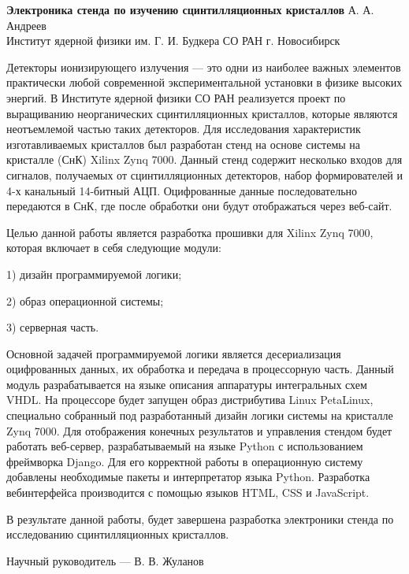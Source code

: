\documentclass[10pt,a5paper]{scrartcl}
\begin{document}
    \begin{center}
        \textbf{Электроника стенда по изучению сцинтилляционных кристаллов}
        \bigbreak
        А. А. Андреев \\
        Институт ядерной физики им. Г. И. Будкера СО РАН г. Новосибирск
    \end{center}

    Детекторы ионизирующего излучения --- это одни из наиболее важных элементов практически любой современной экспериментальной установки в физике высоких энергий. В Институте ядерной физики СО РАН реализуется проект по выращиванию неорганических сцинтилляционных кристаллов, которые являются неотъемлемой частью таких детекторов. Для исследования характеристик изготавливаемых кристаллов был разработан стенд на основе системы на кристалле (СнК) Xilinx Zynq 7000. Данный стенд содержит несколько входов для сигналов, получаемых от сцинтилляционных детекторов, набор формирователей и 4-х канальный 14-битный АЦП. Оцифрованные данные последовательно передаются в СнК, где после обработки они будут отображаться через веб-сайт.\par
    Целью данной работы является разработка прошивки для Xilinx Zynq 7000, которая включает в себя следующие модули:\par
    1) дизайн программируемой логики;\par
    2) образ операционной системы;\par
    3) серверная часть.\par
    Основной задачей программируемой логики является десериализация оцифрованных данных, их обработка и передача в процессорную часть. Данный модуль разрабатывается на языке описания аппаратуры интегральных схем VHDL. На процессоре будет запущен образ дистрибутива Linux PetaLinux, специально собранный под разработанный дизайн логики системы на кристалле Zynq 7000. Для отображения конечных результатов и управления стендом будет работать веб-сервер, разрабатываемый на языке Python с использованием фреймворка Django. Для его корректной работы в операционную систему добавлены необходимые пакеты и интерпретатор языка Python. Разработка вебинтерфейса производится с помощью языков HTML, CSS и JavaScript.\par
    В результате данной работы, будет завершена разработка электроники стенда по исследованию сцинтилляционных кристаллов.\par
\bigbreak
\begin{center}
    Научный руководитель --- В. В. Жуланов 
\end{center} 
\end{document}
